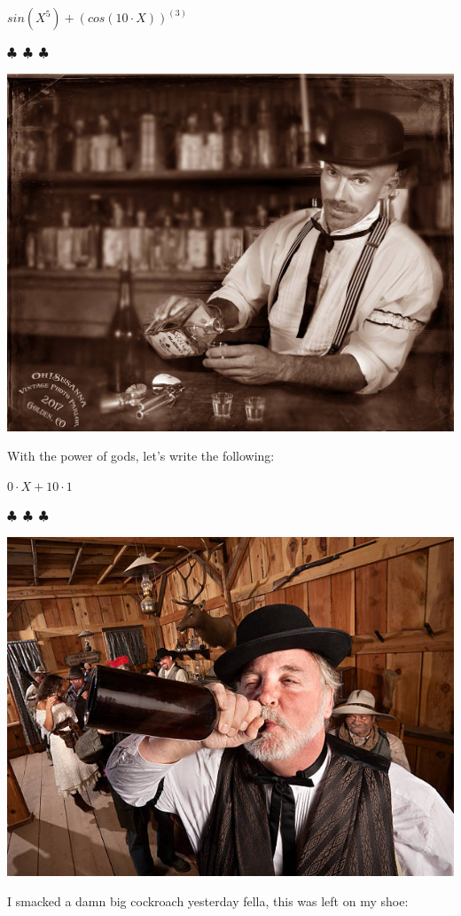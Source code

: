 \documentclass{article}
\begin{document}
\begin{center}$
{{sin{({{X}^{5}})}}+{{({cos{({{10}\cdot{X}})}})}^{({3})}}}
$\end{center}
\begin{center} $\clubsuit$~$\clubsuit$~$\clubsuit$ \end{center}\begin{center}  \includegraphics[scale=0.3]{funny_pics/bartender.jpg} \end{center} With the power of gods, let's write the following: 
\begin{center}$
{{{0}\cdot{X}}+{{10}\cdot{1}}}
$\end{center}
\begin{center} $\clubsuit$~$\clubsuit$~$\clubsuit$ \end{center}\begin{center}  \includegraphics[scale=1.4]{funny_pics/drunk_cowboy.jpg} \end{center} I smacked a damn big cockroach yesterday fella, this was left on my shoe: 
\end{document}
